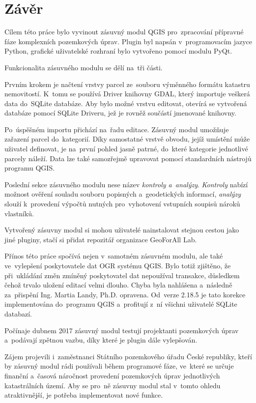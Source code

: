 \chapter{Závěr}
\label{zaver}

Cílem této práce bylo vyvinout zásuvný modul QGIS pro~zpracování přípravné fáze komplexních pozemkových úprav. Plugin byl napsán v~programovacím jazyce Python, grafické uživatelské rozhraní bylo vytvořeno pomocí modulu PyQt.

Funkcionalita zásuvného modulu se dělí na~tři části.

Prvním krokem je načtení vrstvy parcel ze~souboru výměnného formátu katastru nemovitostí. K~tomu se používá  Driver knihovny GDAL, který importuje veškerá data do~SQLite databáze. Aby bylo možné vrstvu editovat, otevírá se vytvořená databáze pomocí SQLite Driveru, jež je rovněž součástí jmenované knihovny.

Po~úspěšném importu přichází na~řadu editace. Zásuvný modul umožňuje zařazení parcel do~kategorií. Díky samostatné vrstvě obvodu, jejíž umístění může uživatel definovat, je na~první pohled jasně patrné, do~které kategorie jednotlivé parcely náleží. Data lze také samozřejmě upravovat pomocí standardních nástrojů programu QGIS.

Poslední sekce zásuvného modulu nese název \textit{kontroly a~analýzy}. \textit{Kontroly} nabízí možnost ověření souladu souboru popisných a~geodetických informací, \textit{analýzy} slouží k~provedení výpočtů nutných pro~vyhotovení vstupních soupisů nároků vlastníků.

Vytvořený zásuvny modul si mohou uživatelé nainstalovat stejnou cestou jako jiné pluginy, stačí si přidat repozitář organizace GeoForAll Lab.

Přínos této práce spočívá nejen v~samotném zásuvném modulu, ale také ve~vylepšení poskytovatele dat OGR systému QGIS. Bylo totiž zjištěno, že při~ukládání změn zmíněný poskytovatel dat nepoužíval transakce, důsledkem čehož trvalo uložení editací velmi dlouho. Chyba byla nahlášena a~následně za~přispění Ing. Martia Landy, Ph.D. opravena. Od~verze 2.18.5 je tato korekce implementována do~programu QGIS a~profitují z~ní všichni uživatelé SQLite databazí.

Počínaje dubnem 2017 zásuvný modul testují projektanti pozemkových úprav a~podávají zpětnou vazbu, díky které je plugin dále vylepšován.

Zájem projevili i~zaměstnanci Státního pozemkového úřadu České republiky, kteří by zásuvný modul rádi používali během programové fáze, ve~které se určuje finanční a~časová náročnost provedení pozemkových úprav jednotlivých katastrálních území. Aby se pro~ně zásuvny modul stal v~tomto ohledu atraktivnější, je potřeba implementovat nové funkce.

